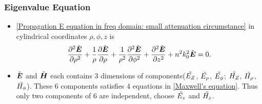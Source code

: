 \documentclass[12pt]{extarticle}
\numberwithin{equation}{section}
\numberwithin{figure}{section}
\numberwithin{table}{section}
\newcommand{\<}{\langle}
\renewcommand{\>}{\rangle}
\theoremstyle{definition}
\begin{document}
        \subsubsection{Eigenvalue Equation}
            \begin{itemize}
                \item \autoref{Propagation E equation in freq domain: small attenuation circumstance} in cylindrical coordinates $\rho,\phi,z$ is
                    \begin{equation}
                        \pdv[2]{\Tilde{\boldsymbol{E}}}{\rho}+\frac{1}{\rho}\pdv{\Tilde{\boldsymbol{E}}}{\rho}+\frac{1}{\rho^2}\pdv[2]{\Tilde{\boldsymbol{E}}}{\phi}+\pdv[2]{\Tilde{\boldsymbol{E}}}{z}+n^2k_0^2\Tilde{\boldsymbol{E}}=0.
                        \label{maxwell equation in cylindrical coordinates}
                    \end{equation}
                \item $\Tilde{\boldsymbol{E}}$ and $\Tilde{\boldsymbol{H}}$ each contains 3 dimensions of components($\Tilde{E_Z}$, $\Tilde{E_\rho}$, $\Tilde{E_\phi}$; $\Tilde{H_Z}$, $\Tilde{H_\rho}$, $\Tilde{H_\phi}$). These 6 components satisfies 4 equations in \autoref{Maxwell's equation}. Thus only two components of 6 are independent, choose $\Tilde{E_z}$ and $\Tilde{H_z}$. 
                

\end{itemize}
\end{document}
